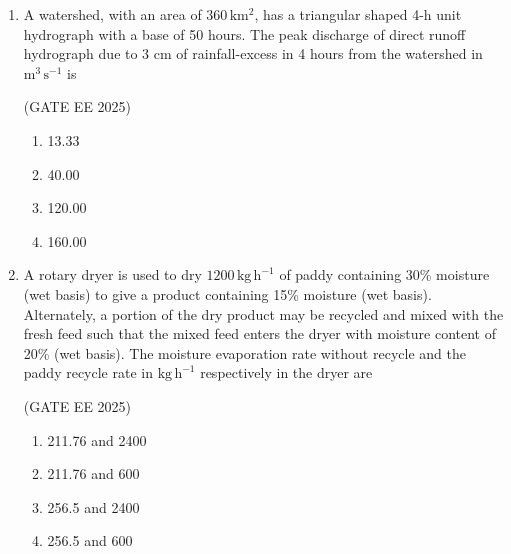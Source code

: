 \documentclass[journal,12pt,onecolumn]{IEEEtran}
\theoremstyle{remark}
\begin{document}
\begin{enumerate}
\begin{multicols}{4}
\begin{enumerate}
    \item  56.40 and 43.60
    \item  69.44 and 30.56
    \item  75.18 and 24.82
    \item  92.60 and 7.40
\end{enumerate}
\end{multicols}

\item A watershed, with an area of $360\,\mathrm{km^2}$, has a triangular shaped 4-h unit hydrograph with a base of 50 hours. The peak discharge of direct runoff hydrograph due to 3 cm of rainfall-excess in 4 hours from the watershed in $\mathrm{m^3\,s^{-1}}$ is\

\hfill(GATE EE 2025)

\begin{multicols}{4}
\begin{enumerate}
    \item 13.33
    \item 40.00
    \item 120.00
    \item 160.00
\end{enumerate}
\end{multicols}

\item A rotary dryer is used to dry $1200\,\mathrm{kg\,h^{-1}}$ of paddy containing 30\% moisture (wet basis) to give a product containing 15\% moisture (wet basis). Alternately, a portion of the dry product may be recycled and mixed with the fresh feed such that the mixed feed enters the dryer with moisture content of 20\% (wet basis). The moisture evaporation rate without recycle and the paddy recycle rate in $\mathrm{kg\,h^{-1}}$ respectively in the dryer are\

\hfill(GATE EE 2025)

\begin{multicols}{2}
    \begin{enumerate}
        \item 211.76 and 2400
        \item 211.76 and 600 
        \item 256.5 and 2400 
        \item 256.5 and 600
    \end{enumerate}
\end{multicols}


\end{enumerate}
\end{document}
